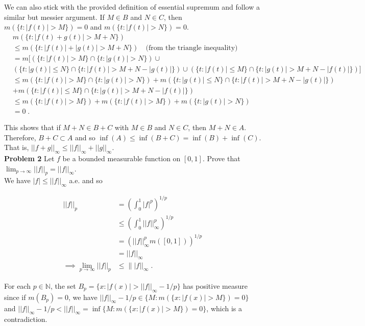\documentclass[a4paper]{article}
\begin{document}
We can also stick with the provided definition of essential supremum and follow a similar but messier argument. If $M \in B$ and $N \in C$, then $m(\{t : |f(t)| > M\}) = 0$ and $m(\{t : |f(t)| > N \}) = 0$.
\begin{align*}
& m(\{t : |f(t) + g(t)| > M + N\}) \\ &\leq m(\{t : |f(t)| + |g(t)| > M + N \}) \quad \text{(from the triangle inequality)}\\
&= m[(\{t : |f(t)| > M\} \cap \{t: |g(t)| > N\})\cup \\ &(\{t : |g(t)| \leq N \} \cap \{t : |f(t)| > M + N - |g(t)|\}) \cup (\{t : |f(t)| \leq M \} \cap \{t : |g(t)| > M + N - |f(t)|\})]\\
&\leq m(\{t : |f(t)| > M\} \cap \{t: |g(t)| > N\})
+ m(\{t : |g(t)| \leq N \} \cap \{t : |f(t)| > M + N - |g(t)|\}) \\ &+ m(\{t : |f(t)| \leq M \} \cap \{t : |g(t)| > M + N - |f(t)|\}) \\
& \leq m(\{t : |f(t)| > M\}) + m(\{t : |f(t)| > M\}) + m(\{t : |g(t)| > N\}) \\
&= 0 \;.
\end{align*}

This shows that if $M+N \in B+C$ with $M \in B$ and $N \in C$, then $M+N \in A$. Therefore, $B+C \subset A$ and so $\inf(A) \leq \inf(B+C) = \inf(B) + \inf(C)$. That is, $||f+g||_\infty \leq ||f||_\infty + ||g||_\infty$. \\

{\bf Problem 2} Let $f$ be a bounded measurable function on $[0,1]$. Prove that $\lim_{p\rightarrow \infty} ||f||_p = ||f||_\infty$. \\

We have $|f| \leq ||f||_\infty$ a.e. and so

\begin{align*}
||f||_p &= \left(\int_0^1 |f|^p\right)^{1/p}\\
&\leq \left(\int_0^1 ||f||_\infty^p \right)^{1/p}\\
&= \left(||f||_\infty^p m([0,1])\right)^{1/p} \\
&= ||f||_\infty\\
\implies \lim_{p\rightarrow \infty} ||f||_p &\leq \||f||_\infty \;. 
\end{align*}

For each $p \in \mathbb{N}$, the set $B_p = \{x : |f(x)| > ||f||_\infty - 1/p\}$ has positive measure since if $m(B_p) = 0$, we have $||f||_\infty - 1/p \in \{M : m(\{x : |f(x)| > M \}) = 0 \}$ and $||f||_\infty - 1/p < ||f||_\infty = \inf \{M : m(\{x : |f(x)| > M \}) = 0 \}$, which is a contradiction. 
\end{document}
